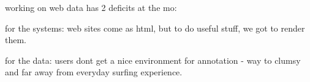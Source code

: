 working on web data has 2 deficits at the mo:


for the systems: web sites come as html, but to do useful stuff, we got to render them.


for the data: users dont get a nice environment for annotation - way to clumsy and far away from everyday surfing experience.

